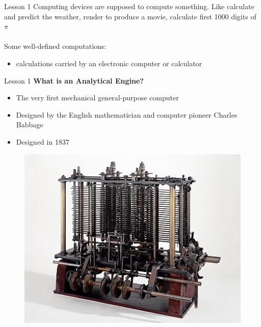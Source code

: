 \documentclass[aspectratio=1610]{beamer}
\begin{document}
\begin{frame}{Lesson 1}{}
\Large
Computing devices are supposed to compute something. Like calculate
and predict the weather, render to produce a movie, calculate first 1000 digits of $\pi$ \\~\\ 
Some well-defined computations:

\begin{itemize}
    \item calculations carried by an electronic computer or calculator
\end{itemize}

\end{frame}


\begin{frame}{Lesson 1}{}
{\Large\textbf{{What is an Analytical Engine?}}}
\Large
\begin{minipage}{0.55\textwidth}
    \begin{itemize}
      \item The very first mechanical general-purpose computer
      \item Designed by the English mathematician and computer pioneer Charles Babbage
      \item Designed in 1837
    \end{itemize}
  \end{minipage}
\begin{minipage}{0.35\textwidth}
      \begin{figure}
        \includegraphics[scale=0.45]{Images/Babbages_AnalyticalEngine}
      \end{figure}
  \end{minipage}  
\end{frame}
\end{document}
